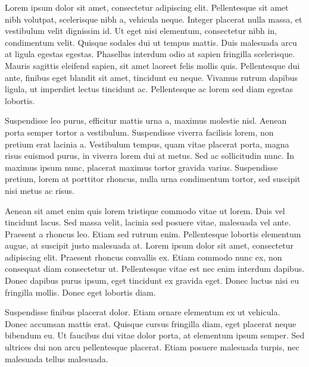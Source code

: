 Lorem ipsum dolor sit amet, consectetur adipiscing elit. Pellentesque sit amet nibh volutpat, scelerisque nibh a, vehicula neque. Integer placerat nulla massa, et vestibulum velit dignissim id. Ut eget nisi elementum, consectetur nibh in, condimentum velit. Quisque sodales dui ut tempus mattis. Duis malesuada arcu at ligula egestas egestas. Phasellus interdum odio at sapien fringilla scelerisque. Mauris sagittis eleifend sapien, sit amet laoreet felis mollis quis. Pellentesque dui ante, finibus eget blandit sit amet, tincidunt eu neque. Vivamus rutrum dapibus ligula, ut imperdiet lectus tincidunt ac. Pellentesque ac lorem sed diam egestas lobortis.

Suspendisse leo purus, efficitur mattis urna a, maximus molestie nisl. Aenean porta semper tortor a vestibulum. Suspendisse viverra facilisis lorem, non pretium erat lacinia a. Vestibulum tempus, quam vitae placerat porta, magna risus euismod purus, in viverra lorem dui at metus. Sed ac sollicitudin nunc. In maximus ipsum nunc, placerat maximus tortor gravida varius. Suspendisse pretium, lorem at porttitor rhoncus, nulla urna condimentum tortor, sed suscipit nisi metus ac risus.

Aenean sit amet enim quis lorem tristique commodo vitae ut lorem. Duis vel tincidunt lacus. Sed massa velit, lacinia sed posuere vitae, malesuada vel ante. Praesent a rhoncus leo. Etiam sed rutrum enim. Pellentesque lobortis elementum augue, at suscipit justo malesuada at. Lorem ipsum dolor sit amet, consectetur adipiscing elit. Praesent rhoncus convallis ex. Etiam commodo nunc ex, non consequat diam consectetur ut. Pellentesque vitae est nec enim interdum dapibus. Donec dapibus purus ipsum, eget tincidunt ex gravida eget. Donec luctus nisi eu fringilla mollis. Donec eget lobortis diam.

Suspendisse finibus placerat dolor. Etiam ornare elementum ex ut vehicula. Donec accumsan mattis erat. Quisque cursus fringilla diam, eget placerat neque bibendum eu. Ut faucibus dui vitae dolor porta, at elementum ipsum semper. Sed ultrices dui non arcu pellentesque placerat. Etiam posuere malesuada turpis, nec malesuada tellus malesuada.
